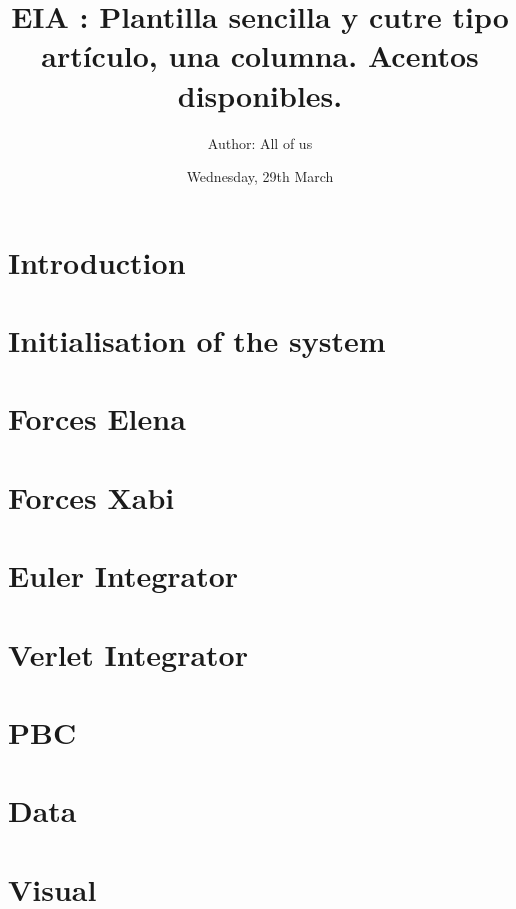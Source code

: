 \documentclass[onecolumn]{article}
\begin{document}
\pagestyle{fancy}


\title{EIA : Plantilla sencilla y cutre tipo artículo, una columna. Acentos disponibles.}
\author{Author: All of us}
\date{Wednesday, 29th March}

\maketitle

\section{Introduction}

\lipsum

\section{Initialisation of the system}

\lipsum

\section{Forces Elena}

\lipsum

\section{Forces Xabi}

\lipsum

\section{Euler Integrator}

\lipsum

\section{Verlet Integrator}

\lipsum

\section{PBC}

\lipsum

\section{Data}

\lipsum

\section{Visual}

\lipsum
\end{document}
